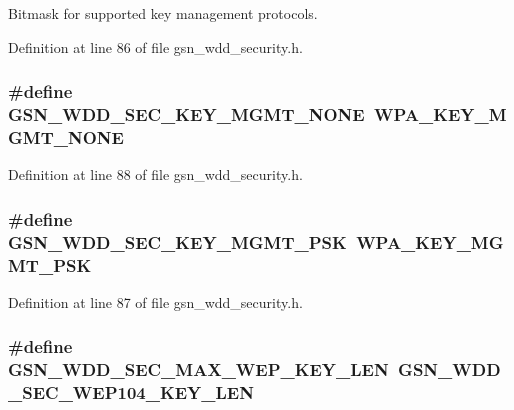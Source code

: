 Bitmask for supported key management protocols. 



Definition at line 86 of file gsn\_\-wdd\_\-security.h.

\hypertarget{a00604_a0043f53b892145ca8db0bf60faa9e0a4}{
\subsubsection[{GSN\_\-WDD\_\-SEC\_\-KEY\_\-MGMT\_\-NONE}]{\setlength{\rightskip}{0pt plus 5cm}\#define GSN\_\-WDD\_\-SEC\_\-KEY\_\-MGMT\_\-NONE~WPA\_\-KEY\_\-MGMT\_\-NONE}}
\label{a00604_a0043f53b892145ca8db0bf60faa9e0a4}


Definition at line 88 of file gsn\_\-wdd\_\-security.h.

\hypertarget{a00604_a448137180afc88b52d94479e7c40b08a}{
\subsubsection[{GSN\_\-WDD\_\-SEC\_\-KEY\_\-MGMT\_\-PSK}]{\setlength{\rightskip}{0pt plus 5cm}\#define GSN\_\-WDD\_\-SEC\_\-KEY\_\-MGMT\_\-PSK~WPA\_\-KEY\_\-MGMT\_\-PSK}}
\label{a00604_a448137180afc88b52d94479e7c40b08a}


Definition at line 87 of file gsn\_\-wdd\_\-security.h.

\hypertarget{a00604_a092fca8a7c994f74280b9a72d5eb45d0}{
\subsubsection[{GSN\_\-WDD\_\-SEC\_\-MAX\_\-WEP\_\-KEY\_\-LEN}]{\setlength{\rightskip}{0pt plus 5cm}\#define GSN\_\-WDD\_\-SEC\_\-MAX\_\-WEP\_\-KEY\_\-LEN~GSN\_\-WDD\_\-SEC\_\-WEP104\_\-KEY\_\-LEN}}
\label{a00604_a092fca8a7c994f74280b9a72d5eb45d0}


